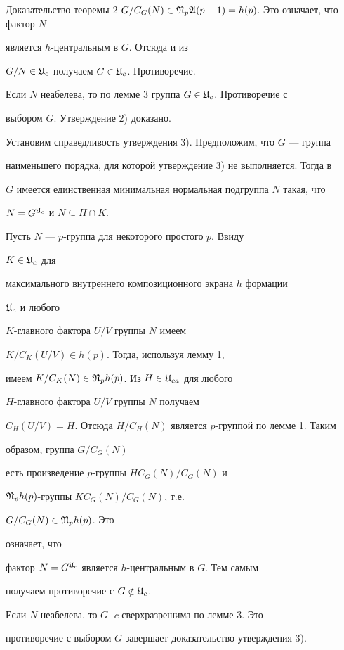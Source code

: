 \begin{pf*}{Доказательство теоремы 2}
$G/C_G(N)\in\frak N_p\frak A(p-1)=h(p)$. Это означает, что фактор $N$


является $h$-центральным в $G$. Отсюда и из


$G/N\in\frak U_c$ получаем $G\in\frak U_c$. Противоречие.





Если $N$ неабелева, то по лемме 3 группа $G\in\frak U_c$. Противоречие с


выбором $G$. Утверждение 2) доказано.





Установим справедливость утверждения 3). Предположим, что $G$ --- группа


наименьшего порядка, для которой утверждение 3) не выполняется. Тогда в


$G$ имеется единственная минимальная нормальная подгруппа $N$ такая, что


$N=G^{\frak U_c}$ и $N\subseteq H\cap K$.





Пусть $N$ --- $p$-группа для некоторого простого $p$. Ввиду


$K\in\frak U_c$ для


максимального внутреннего композиционного экрана $h$ формации


$\frak U_c$ и любого


$K$-главного фактора $U/V$ группы $N$ имеем


$K/C_K(U/V)\in h(p)$. Тогда, используя лемму 1,


имеем $K/C_K(N)\in\frak N_ph(p)$. Из $H\in \frak U_{ca}$ для любого


$H$-главного фактора $U/V$ группы $N$ получаем


$C_H(U/V)=H$. Отсюда $H/C_H(N)$ является $p$-группой по лемме 1. Таким


образом, группа $G/C_G(N)$


есть произведение $p$-группы $HC_G(N)/C_G(N)$ и


$\frak N_ph(p)$-группы $KC_G(N)/C_G(N)$, т.е.


$G/C_G(N)\in\frak N_ph(p)$. Это


означает, что


фактор $N=G^{\frak U_c}$ является $h$-центральным в $G$. Тем самым


получаем противоречие с $G\notin\frak U_c$.





Если $N$ неабелева, то $G\;$ $c$-сверхразрешима по лемме 3. Это


противоречие с выбором $G$ завершает доказательство утверждения 3).


\end{pf*}





